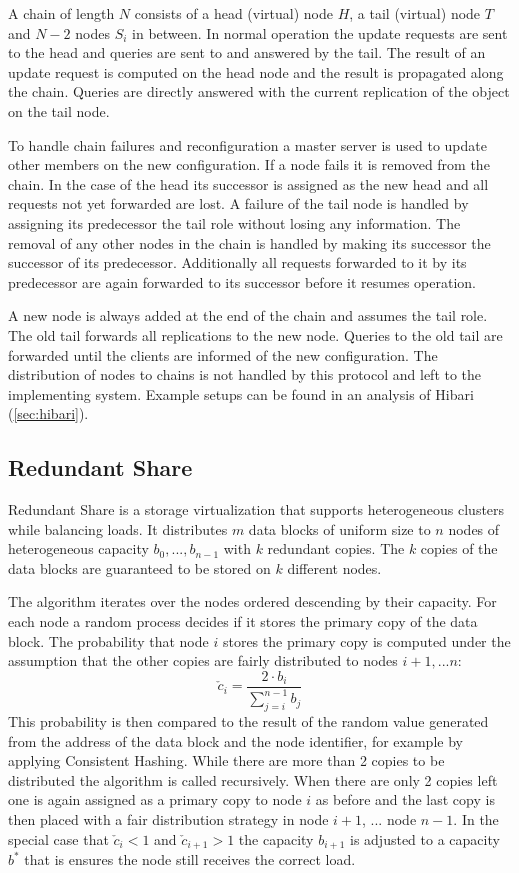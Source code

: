 A chain of length $N$ consists of a head (virtual) \gls{node} $H$, a tail (virtual) \gls{node} $T$ and $N-2$ \glspl{node} $S_i$ in between.
In normal operation the update requests are sent to the head and queries are sent to and answered by the tail.
The result of an update request is computed on the head \gls{node} and the result is propagated along the chain.
Queries are directly answered with the current replication of the object on the tail \gls{node}.

To handle chain failures and reconfiguration a master server is used to update other members on the new configuration.
If a \gls{node} fails it is removed from the chain.
In the case of the head its successor is assigned as the new head and all requests not yet forwarded are lost.
A failure of the tail node is handled by assigning its predecessor the tail role without losing any information.
The removal of any other \glspl{node} in the chain is handled by making its successor the successor of its predecessor.
Additionally all requests forwarded to it by its predecessor are again forwarded to its successor before it resumes operation.

A new \gls{node} is always added at the end of the chain and assumes the tail role.
The old tail forwards all replications to the new \gls{node}.
Queries to the old tail are forwarded until the clients are informed of the new configuration.
The distribution of \glspl{node} to chains is not handled by this protocol and left to the implementing system.
Example setups can be found in an analysis of Hibari\cite{Fritchie2010} (\cref{sec:hibari}).


\subsection{Redundant Share}
Redundant Share\cite{Brinkmann2007} is a storage virtualization that supports heterogeneous \glspl{cluster} while balancing loads.
It distributes $m$ data blocks of uniform size to $n$ \glspl{node} of heterogeneous capacity $b_0,...,b_{n-1}$ with $k$ redundant copies.
The $k$ copies of the data blocks are guaranteed to be stored on $k$ different \glspl{node}.

The algorithm iterates over the \glspl{node} ordered descending by their capacity.
For each \gls{node} a random process decides if it stores the primary copy of the data block.
The probability that \gls{node} $i$ stores the primary copy is computed under the assumption that the other copies are fairly distributed to \glspl{node} $i+1,...n$:
\[
\check c_i = \frac{2\cdot b_i}{\sum\limits_{j=i}^{n-1}b_j}
\]
This probability is then compared to the result of the random value generated from the address of the data block and the \gls{node} identifier, for example by applying Consistent Hashing.
While there are more than 2 copies to be distributed the algorithm is called recursively.
When there are only 2 copies left one is again assigned as a primary copy to \gls{node} $i$ as before and the last copy is then placed with a fair distribution strategy in \gls{node} $i+1$, ... \gls{node} $n-1$.
In the special case that $\check c_i < 1$ and $\check c_{i+1} > 1$ the capacity $b_{i+1}$ is adjusted to a capacity $b^*$ that is ensures the \gls{node} still receives the correct load.

